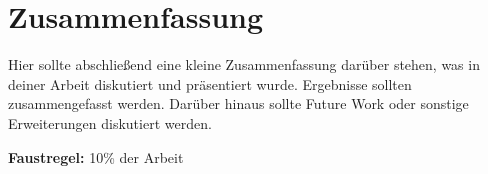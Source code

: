 
\chapter{Zusammenfassung}\label{chapter:conclusion}

Hier sollte abschließend eine kleine Zusammenfassung darüber stehen, was in deiner Arbeit diskutiert und präsentiert wurde. 
Ergebnisse sollten zusammengefasst werden. 
Darüber hinaus sollte Future Work oder sonstige Erweiterungen diskutiert werden.

\textbf{Faustregel:} 10\% der Arbeit